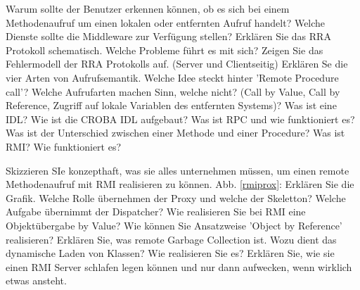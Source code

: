 \documentclass[ngerman,a4paper,12pt]{scrreprt}
\begin{document}
\olR
	\li Warum sollte der Benutzer erkennen können, ob es sich bei einem Methodenaufruf um einen lokalen oder entfernten Aufruf handelt?
	\li Welche Dienste sollte die Middleware zur Verfügung stellen?
	\li Erklären Sie das RRA Protokoll schematisch. Welche Probleme führt es mit sich?
	\li Zeigen Sie das Fehlermodell der RRA Protokolls auf. (Server und Clientseitig)
	\li Erklären Se die vier Arten von Aufrufsemantik.
	\li Welche Idee steckt hinter 'Remote Procedure call'? Welche Aufrufarten machen Sinn, welche nicht? (Call by Value, Call by Reference, Zugriff auf lokale Variablen des entfernten Systems)?
	\li Was ist eine IDL? Wie ist die CROBA IDL aufgebaut?
	\li Was ist RPC und wie funktioniert es?
	\li Was ist der Unterschied zwischen einer Methode und einer Procedure?
	\li Was ist RMI? Wie funktioniert es?
\olS

\olR
	\li Skizzieren SIe konzepthaft, was sie alles unternehmen müssen, um einen remote Methodenaufruf mit RMI realisieren zu können.
	\li Abb. \ref{rmiprox}: Erklären Sie die Grafik.
	\li Welche Rolle übernehmen der Proxy und welche der Skeletton?
	\li Welche Aufgabe übernimmt der Dispatcher?
	\li Wie realisieren Sie bei RMI eine Objektübergabe by Value? Wie können Sie Ansatzweise 'Object by Reference' realisieren?
	\li Erklären Sie, was remote Garbage Collection ist.
	\li Wozu dient das dynamische Laden von Klassen? Wie realisieren Sie es?
	\li Erklären Sie, wie sie einen RMI Server schlafen legen können und nur dann aufwecken, wenn wirklich etwas ansteht.
\olS


\end{document}
